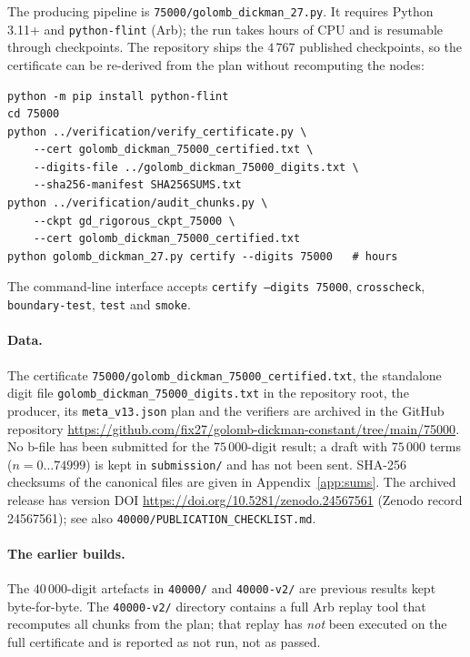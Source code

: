 \documentclass[11pt,a4paper]{article}
\theoremstyle{remark}
\begin{document}
The producing pipeline is \texttt{75000/golomb\_dickman\_27.py}. It
requires Python 3.11+ and \texttt{python-flint} \cite{pythonflint} (Arb);
the run takes hours of CPU and is resumable through checkpoints. The
repository ships the $4\,767$ published checkpoints, so the certificate
can be re-derived from the plan without recomputing the nodes:

\begin{lstlisting}
python -m pip install python-flint
cd 75000
python ../verification/verify_certificate.py \
    --cert golomb_dickman_75000_certified.txt \
    --digits-file ../golomb_dickman_75000_digits.txt \
    --sha256-manifest SHA256SUMS.txt
python ../verification/audit_chunks.py \
    --ckpt gd_rigorous_ckpt_75000 \
    --cert golomb_dickman_75000_certified.txt
python golomb_dickman_27.py certify --digits 75000   # hours
\end{lstlisting}

The command-line interface accepts
\texttt{certify --digits 75000}, \texttt{crosscheck},
\texttt{boundary-test}, \texttt{test} and \texttt{smoke}.

\paragraph{Data.}
The certificate \texttt{75000/golomb\_dickman\_75000\_certified.txt}, the
standalone digit file \texttt{golomb\_dickman\_75000\_digits.txt} in the
repository root, the producer, its \texttt{meta\_v13.json} plan and the
verifiers are archived in the GitHub repository
\url{https://github.com/fix27/golomb-dickman-constant/tree/main/75000}.
No b-file has been submitted for the $75\,000$-digit result; a draft with
$75\,000$ terms ($n=0\ldots 74999$) is kept in \texttt{submission/} and has not
been sent. SHA-256 checksums of the canonical files are given in
Appendix~\ref{app:sums}. The archived release has version DOI
\url{https://doi.org/10.5281/zenodo.24567561} (Zenodo record 24567561); see
also \texttt{40000/PUBLICATION\_CHECKLIST.md}.

\paragraph{The earlier builds.}
The $40\,000$-digit artefacts in \texttt{40000/} and \texttt{40000-v2/} are
previous results kept byte-for-byte. The \texttt{40000-v2/} directory contains
a full Arb replay tool that recomputes all chunks from the plan; that replay has
\emph{not} been executed on the full certificate and is reported as not
run, not as passed.
\end{document}
